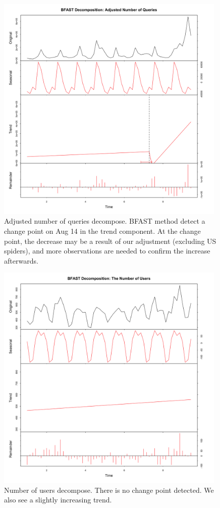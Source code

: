 \documentclass[12pt,]{article}
\begin{document}
\begin{figure}[H]
\centering
\includegraphics[width=11cm,height=11cm,keepaspectratio]{figures/adjust_query_decompose.png}
\caption{Adjusted number of queries decompose. BFAST method detect a
change point on Aug 14 in the trend component. At the change point, the
decrease may be a result of our adjustment (excluding US spiders), and
more observations are needed to confirm the increase afterwards.}
\end{figure}

\begin{figure}[H]
\centering
\includegraphics[width=11cm,height=11cm,keepaspectratio]{figures/user_decompose.png}
\caption{Number of users decompose. There is no change point detected.
We also see a slightly increasing trend.}
\end{figure}
\end{document}
